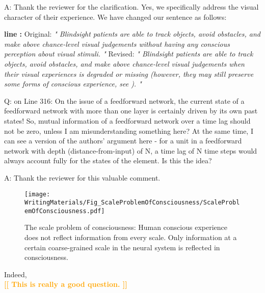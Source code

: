\documentclass[utf8]{article}
\newcounter{cQuestion}[section]
\newenvironment{question}
    {\refstepcounter{cQuestion}\color{Blue}\noindent\newline Q\thecQuestion:}
    {~\newline}
\newenvironment{ans}  
    {\color{Black}\noindent A:}
    {~\newline}
\newcommand{\revise}[3]{
	\newline
	\newline
    \noindent
    \textbf{line #1:}
    \newline
    Original:\newline
    \textit{"#2"}
    \newline
    \newline
    Revised:\newline
    \textit{"#3"}\newline}
\newcommand{\toWrite}[1]{\noindent
	\textcolor{Orange}{\textbf{[[ #1 ]]}}}
\begin{document}
    
   		\begin{ans}
   			Thank the reviewer for the clarification. 
   			Yes, we specifically address the visual character of their experience.
   			We have changed our sentence as follows:
   			\revise{}
   			{
   				Blindsight patients are able to track objects, avoid obstacles, and make above chance-level visual judgements without having any conscious perception about visual stimuli.
   			}
   			{
   				Blindsight patients are able to track objects, avoid obstacles, and make above chance-level visual judgements when their visual experiences is degraded or missing (however, they may still preserve some forms of conscious experience, see \cite{overgaard2011visual, mazzi2016blind}). 
   			}
   		\end{ans}
    
    
    
    
    	\begin{question}
            on Line 316: On the issue of a feedforward network, the current state of a feedforward network with more than one layer is certainly driven by its own past states! So, mutual information of a feedforward network over a time lag should not be zero, unless I am misunderstanding something here?
			At the same time, I can see a version of the authors' argument here - for a unit in a feedforward network with depth (distance-from-input) of N, a time lag of N time steps would always account fully for the states of the element. Is this the idea?		
    	\end{question}
    
 		\begin{ans}
 			Thank the reviewer for this valuable comment. 
 			\begin{figure}[H]
 				\centering
 				\texttt{[image: WritingMaterials/Fig\_ScaleProblemOfConsciousness/ScaleProblemOfConsciousness.pdf]}
 				\caption{The scale problem of consciousness: Human conscious experience does not reflect information from every scale. Only information at a certain coarse-grained scale in the neural system is reflected in consciousness.}
 				\label{fig:scaleproblem}
 			\end{figure}
 			
 			Indeed, 
 			\\
 			\toWrite{This is really a good question.}
 		\end{ans}
 	
\end{document}
